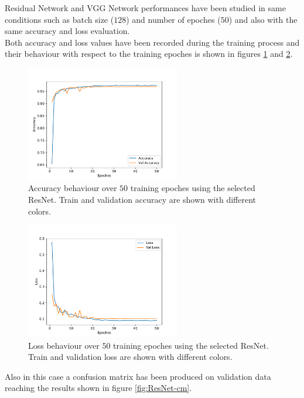 Residual Network and VGG Network performances have been studied in same conditions such as batch size ($128$) and number of epoches ($50$) and also with the same accuracy and loss evaluation.\\
Both accuracy and loss values have been recorded during the training process and their behaviour with respect to the training epoches is shown in figures \ref{fig:ResNet-acc} and \ref{fig:ResNet-loss}.

\begin{figure}
	\centering
	\includegraphics[width=0.6\textwidth]{IMG/Cap6/ResNet-D_Accuracy.pdf}
	\caption{Accuracy behaviour over $50$ training epoches using the selected ResNet. Train and validation accuracy are shown with different colors.}
	\label{fig:ResNet-acc}
\end{figure}

\begin{figure}
	\centering
	\includegraphics[width=0.6\textwidth]{IMG/Cap6/ResNet-D_Loss.pdf}
	\caption{Loss behaviour over $50$ training epoches using the selected ResNet. Train and validation loss are shown with different colors.}
	\label{fig:ResNet-loss}
\end{figure}

Also in this case a confusion matrix has been produced on validation data reaching the results shown in figure \ref{fig:ResNet-cm}.

